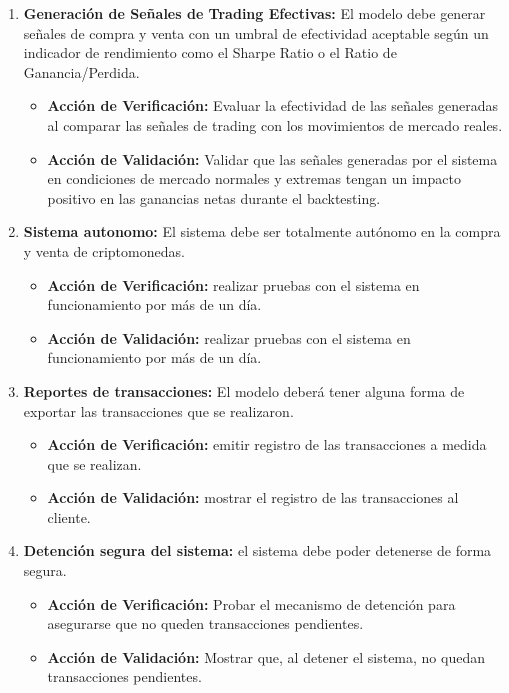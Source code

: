 \documentclass[
    11pt, %
]{charter}
\begin{document}
\begin{enumerate}
    \item \textbf{Generación de Señales de Trading Efectivas:} El modelo debe generar señales de compra y venta con un umbral de efectividad aceptable según un indicador de rendimiento como el Sharpe Ratio o el Ratio de Ganancia/Perdida.
      \begin{itemize}
      \item \textbf{Acción de Verificación:} Evaluar la efectividad de las señales generadas al comparar las señales de trading con los movimientos de mercado reales.
      \item \textbf{Acción de Validación:} Validar que las señales generadas por el sistema en condiciones de mercado normales y extremas tengan un impacto positivo en las ganancias netas durante el backtesting.
      \end{itemize}

    \item \textbf{Sistema autonomo:} El sistema debe ser totalmente autónomo en la compra y venta de criptomonedas.
      \begin{itemize}
      \item \textbf{Acción de Verificación:} realizar pruebas con el sistema en funcionamiento por más de un día.
      \item \textbf{Acción de Validación:} realizar pruebas con el sistema en funcionamiento por más de un día.
      \end{itemize}

    \item \textbf{Reportes de transacciones:} El modelo deberá tener alguna forma de exportar las transacciones que se realizaron.
      \begin{itemize}
      \item \textbf{Acción de Verificación:} emitir registro de las transacciones a medida que se realizan.
      \item \textbf{Acción de Validación:} mostrar el registro de las transacciones al cliente.
      \end{itemize}

    \item \textbf{Detención segura del sistema:} el sistema debe poder detenerse de forma segura.
      \begin{itemize}
      \item \textbf{Acción de Verificación:} Probar el mecanismo de detención para asegurarse que no queden transacciones pendientes.
      \item \textbf{Acción de Validación:} Mostrar que, al detener el sistema, no quedan transacciones pendientes.
      \end{itemize}

    \end{enumerate}
\end{document}
